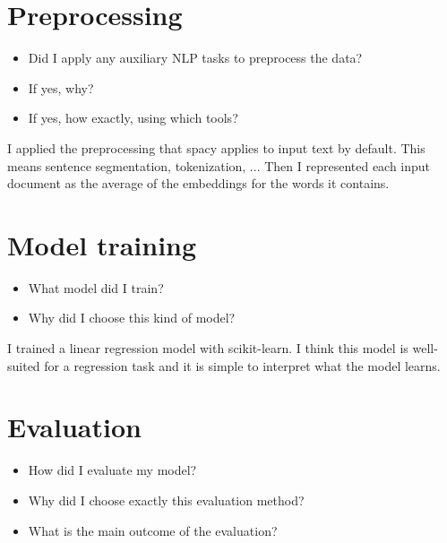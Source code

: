 \documentclass[11pt]{article}
\begin{document}
\section{Preprocessing}

\begin{itemize}
    \item Did I apply any auxiliary NLP tasks to preprocess the data?
    \item If yes, why?
    \item If yes, how exactly, using which tools?
\end{itemize}

\begin{tcolorbox}[colback=green!5!white,colframe=green!75!black,title=Example]
  I applied the preprocessing that spacy applies to input text by default. This means sentence segmentation, tokenization, ...
  Then I represented each input document as the average of the embeddings for the words it contains.
\end{tcolorbox}

\section{Model training}

\begin{itemize}
    \item What model did I train?
    \item Why did I choose this kind of model?
\end{itemize}

\begin{tcolorbox}[colback=green!5!white,colframe=green!75!black,title=Example]
  I trained a linear regression model with scikit-learn.
  I think this model is well-suited for a regression task and it is simple to interpret what the model learns.
\end{tcolorbox}

\section{Evaluation}

\begin{itemize}
    \item How did I evaluate my model?
    \item Why did I choose exactly this evaluation method?
    \item What is the main outcome of the evaluation?
\end{itemize}
\end{document}
